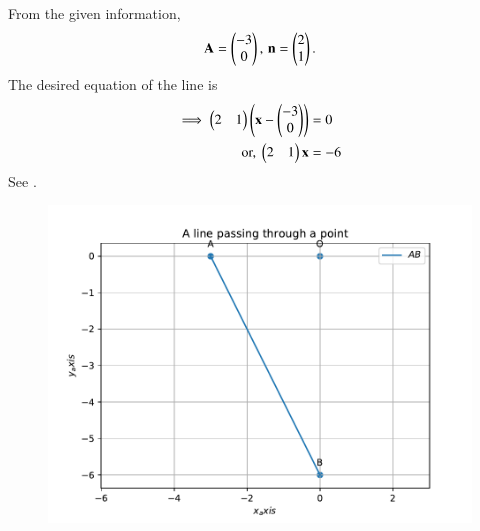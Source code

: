 		From the given information,
\begin{align}		
	\mathbf{A}=\begin{pmatrix}-3\\0\end{pmatrix},\,
\mathbf{n} = \begin{pmatrix}2 \\1\end{pmatrix}.
\end{align}
The desired equation of the line is
\begin{align}
\implies	\begin{pmatrix} 2 & 1 \end{pmatrix} \left( \mathbf{x} - \begin{pmatrix} -3 \\ 0\end{pmatrix}\right) &= 0  \\
	\text{or, }	\begin{pmatrix} 2 & 1\end{pmatrix} \mathbf{x}  &= -6
        \label{eq:chapters/11/10/2/5/1}
\end{align}
See .
\begin{figure}[!h]
	\begin{center}
		\includegraphics[width=\columnwidth]{chapters/11/10/2/5/figs/line1.pdf}
	\end{center}
\caption{}
\label{fig:chapters/11/10/2/5/Fig1}
\end{figure}

